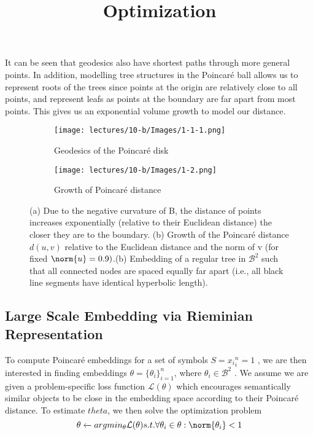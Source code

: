 It can be seen that geodesics also have shortest paths through more general points. In addition, modelling tree structures in the Poincaré ball allows us to represent roots of the trees since points at the origin are relatively close to all points, and represent leafs as points at the boundary are far apart from most points. 
This gives us an exponential volume growth to model our distance.

\begin{figure}[htb]
    \centering
    \begin{subfigure}[b]{0.3\textwidth}
    \texttt{[image: lectures/10-b/Images/1-1-1.png]}
        \caption{Geodesics of the Poincaré disk}
        \label{fig:poincaredisk}
    \end{subfigure}
    \begin{subfigure}[b]{0.29\textwidth}
        \texttt{[image: lectures/10-b/Images/1-2.png]}
        \caption{Growth of Poincaré distance}       
        \label{fig:poincaregrowthdist}
    \end{subfigure}
    \caption{(a) Due to the negative curvature of B, the distance of points increases exponentially (relative to their Euclidean distance) the closer they are to the boundary. (b) Growth of the Poincaré distance $d(u, v)$ relative to the Euclidean distance and the norm of v (for fixed $\norm{u} = 0.9)$.(b) Embedding of a regular tree in $\mathcal{B} ^2$ such that all connected nodes are spaced equally far apart (i.e., all black line segments have identical hyperbolic length).}\label{fig:poincarreilus}
\end{figure}

\subsection{Large Scale Embedding via Rieminian Representation}
\title{Optimization}

To compute Poincaré embeddings for a set of symbols $S = {x_i}_i^n =1$ , we are then interested in finding
embeddings $\theta = {\big\{ \theta_i\big\}}_{i=1}^n$, where $\theta_i \in  \mathscr{B}^2$ . We assume we are given a problem-specific loss function $\mathcal{L}(\theta)$ which encourages semantically similar objects to be close in the embedding space according to their Poincaré distance. To estimate $theta$, we then solve the optimization problem
\begin{equation} \label{eq:poincarresdg}
    \theta \xleftarrow{} argmin_\theta   \mathcal{L}(\theta)  s.t. \forall  \theta_i \in \theta : \norm{\theta_i} < 1
\end{equation}

